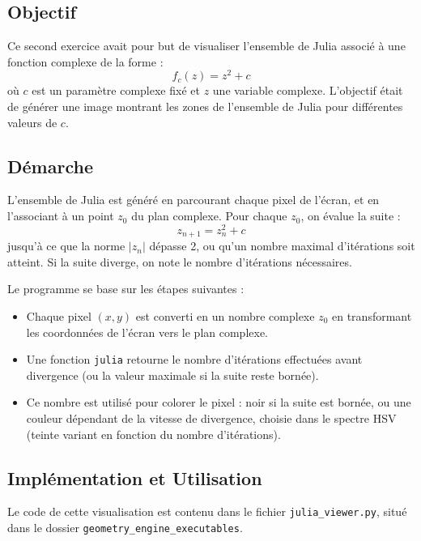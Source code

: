 \documentclass[a4paper,12pt]{article}
\begin{document}
\newpage


\subsection*{Objectif}

Ce second exercice avait pour but de visualiser l'ensemble de Julia associé à une fonction complexe de la forme :
\[
f_c(z) = z^2 + c
\]
où \(c\) est un paramètre complexe fixé et \(z\) une variable complexe. L'objectif était de générer une image montrant les zones de l'ensemble de Julia pour différentes valeurs de \(c\).

\subsection*{Démarche}

L'ensemble de Julia est généré en parcourant chaque pixel de l'écran, et en l'associant à un point \(z_0\) du plan complexe. Pour chaque \(z_0\), on évalue la suite :
\[
z_{n+1} = z_n^2 + c
\]
jusqu'à ce que la norme \(|z_n|\) dépasse 2, ou qu’un nombre maximal d’itérations soit atteint. Si la suite diverge, on note le nombre d’itérations nécessaires.

Le programme se base sur les étapes suivantes :

\begin{itemize}
    \item Chaque pixel \((x, y)\) est converti en un nombre complexe \(z_0\) en transformant les coordonnées de l'écran vers le plan complexe.
    \item Une fonction \texttt{julia} retourne le nombre d’itérations effectuées avant divergence (ou la valeur maximale si la suite reste bornée).
    \item Ce nombre est utilisé pour colorer le pixel : noir si la suite est bornée, ou une couleur dépendant de la vitesse de divergence, choisie dans le spectre HSV (teinte variant en fonction du nombre d’itérations).
\end{itemize}

\subsection*{Implémentation et Utilisation}

Le code de cette visualisation est contenu dans le fichier \texttt{julia\_viewer.py}, situé dans le dossier \texttt{geometry\_engine\_executables}.
\end{document}
